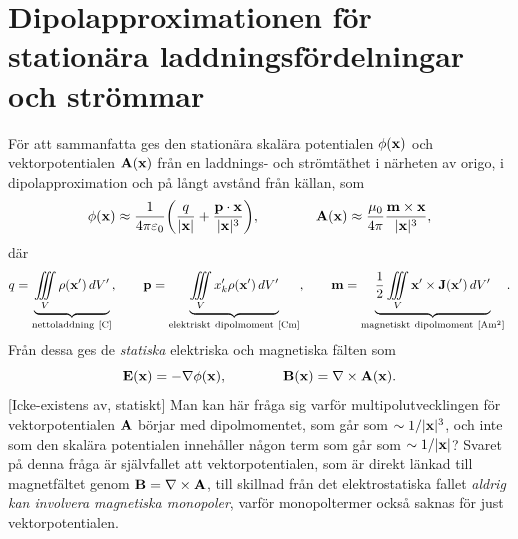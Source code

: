 \section{Dipolapproximationen f{\"o}r station{\"a}ra laddningsf{\"o}rdelningar
   och str{\"o}mmar}
F{\"o}r att sammanfatta ges den station{\"a}ra skal{\"a}ra potentialen
$\phi({\bf x})$ och vektorpotentialen ${\bf A}({\bf x})$ fr{\aa}n en
laddnings- och str{\"o}mt{\"a}thet i n{\"a}rheten av origo, i dipolapproximation
och p{\aa} l{\aa}ngt avst{\aa}nd fr{\aa}n k{\"a}llan, som
$$
  \phi({\bf x})\approx{{1}\over{4\pi\varepsilon_0}}\bigg(
      {{q}\over{|{\bf x}|}} + {{{\bf p}\cdot{\bf x}}\over{|{\bf x}|^3}}
    \bigg),\qquad\qquad
  {\bf A}({\bf x})\approx{{\mu_0}\over{4\pi}}
      {{{\bf m}\times{\bf x}}\over{|{\bf x}|^3}},
$$
d{\"a}r
$$
  q=\underbrace{
      \iiint_{V} \rho({\bf x}')\,dV'
    }_{{\rm nettoladdning}\ [{\rm C}]},\qquad
  {\bf p}=\underbrace{
      \iiint_{V} x'_k \rho({\bf x}')\,dV'
    }_{{\rm elektriskt\ dipolmoment}\ [{\rm C}{\rm m}]},\qquad
  {\bf m}=\underbrace{
      {{1}\over{2}}\iiint_{V} {\bf x}'\times{\bf J}({\bf x}')\,dV'
    }_{{\rm magnetiskt\ dipolmoment}\ [{\rm A}{\rm m}^2]}.
$$
Fr{\aa}n dessa ges de {\it statiska} elektriska och magnetiska f{\"a}lten
som
$$
  {\bf E}({\bf x})=-\nabla\phi({\bf x}),\qquad\qquad
  {\bf B}({\bf x})=\nabla\times{\bf A}({\bf x}).
$$
[Icke-existens av, statiskt]
Man kan h{\"a}r fr{\aa}ga sig varf{\"o}r multipolutvecklingen f{\"o}r
vektorpotentialen ${\bf A}$ b{\"o}rjar med dipolmomentet, som g{\aa}r som
$\sim 1/|{\bf x}|^3$, och inte som den skal{\"a}ra potentialen inneh{\aa}ller
n{\aa}gon term som g{\aa}r som $\sim 1/|{\bf x}|$? Svaret p{\aa} denna
fr{\aa}ga {\"a}r sj{\"a}lvfallet att vektorpotentialen, som {\"a}r direkt
l{\"a}nkad till magnetf{\"a}ltet genom ${\bf B}=\nabla\times{\bf A}$, till
skillnad fr{\aa}n det elektrostatiska fallet {\it aldrig kan involvera
magnetiska monopoler}, varf{\"o}r monopoltermer ocks{\aa} saknas f{\"o}r
just vektorpotentialen.
\vfill\eject

